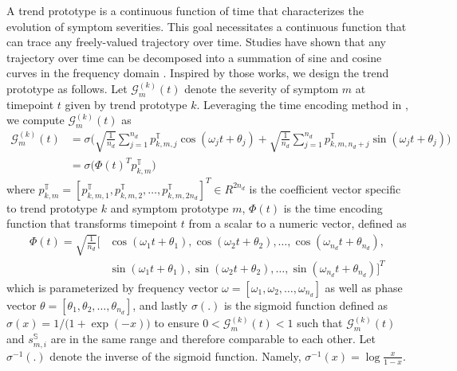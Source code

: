 \documentclass[mnsc]{informs3b} %
\begin{document}
A trend prototype is a continuous function of time that characterizes the evolution of symptom severities. This goal necessitates a continuous function that can trace any freely-valued trajectory over time. Studies have shown that any trajectory over time can be decomposed into a summation of sine and cosine curves in the frequency domain \citep{xu_inductive_2020, wang_word2fun_2021}. Inspired by those works, we design the trend prototype as follows. Let $\mathcal{G}_{m}^{(k)}(t)$ denote the severity of symptom $m$ at timepoint $t$ given by trend prototype $k$. Leveraging the time encoding method in \cite{xu_inductive_2020}, we compute $\mathcal{G}_{m}^{(k)}(t)$ as 
\begin{equation}
\label{eq:g_m_k}
\begin{aligned}
\mathcal{G}_{m}^{(k)}(t) &= \sigma \Big( \sqrt{\frac{1}{n_d}} \sum_{j=1}^{n_d} p_{k,m,j}^{\mathbb{T}} \cos(\omega_j t + \theta_j) + \sqrt{\frac{1}{n_d}} \sum_{j=1}^{n_d} p_{k,m,n_d+j}^{\mathbb{T}} \sin(\omega_j t + \theta_j) \Big) \\
  &= \sigma \big( \Phi ( t )^T p_{k,m}^{\mathbb{T}} \big)
\end{aligned}    
\end{equation}
where $p_{k,m}^{\mathbb{T}} = [p_{k,m,1}^{\mathbb{T}}, p_{k,m,2}^{\mathbb{T}}, \dots, p_{k,m,2 n_d}^{\mathbb{T}} ]^T \in R^{2 n_d}$ is the coefficient vector specific to trend prototype $k$ and symptom prototype $m$, $\Phi(t)$ is the time encoding function \citep{xu_inductive_2020} that transforms timepoint $t$ from a scalar to a numeric vector, defined as
\begin{equation}
\label{eq:time_encoding}
\begin{aligned}
\Phi(t) = \sqrt{\frac{1}{n_d}} \big[ &\cos(\omega_1 t+\theta_1), \cos(\omega_2 t+\theta_2), \dots, \cos(\omega_{n_d} t+\theta_{n_d}), \\
& \sin(\omega_1 t+\theta_1), \sin(\omega_2 t+\theta_2), \dots, \sin(\omega_{n_d} t+\theta_{n_d}) \big]^T
\end{aligned}
\end{equation}  
which is parameterized by frequency vector $\omega=[\omega_1,\omega_2,\dots,\omega_{n_d}]$ as well as phase vector $\theta=[\theta_1,\theta_2,\dots,\theta_{n_d}]$, and lastly $\sigma(.)$ is the sigmoid function defined as $\sigma(x)=1/\big(1+\exp(-x)\big)$ to ensure $0 < \mathcal{G}_{m}^{(k)}(t) < 1$ such that $\mathcal{G}_{m}^{(k)}(t)$ and $s_{m,i}^{\mathbb{S}}$ are in the same range and therefore comparable to each other.
Let $\sigma^{-1}(.)$ denote the inverse of the sigmoid function. Namely, $\sigma^{-1}(x)=\log \frac{x}{1-x}$. 
\end{document}
